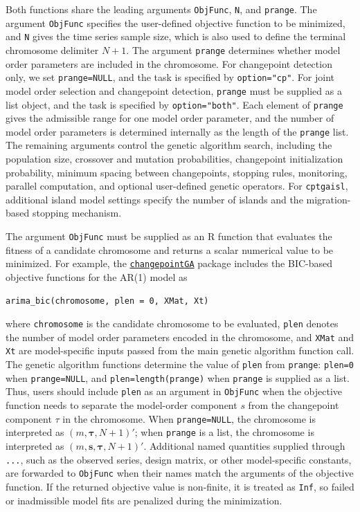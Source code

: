 Both functions share the leading arguments \texttt{ObjFunc}, \texttt{N}, and \texttt{prange}. The argument \texttt{ObjFunc} specifies the user-defined objective function to be minimized, and \texttt{N} gives the time series sample size, which is also used to define the terminal chromosome delimiter \(N+1\). The argument \texttt{prange} determines whether model order parameters are included in the chromosome. For changepoint detection only, we set \texttt{prange=NULL}, and the task is specified by \texttt{option="cp"}. For joint model order selection and changepoint detection, \texttt{prange} must be supplied as a list object, and the task is specified by \texttt{option="both"}. Each element of \texttt{prange} gives the admissible range for one model order parameter, and the number of model order parameters is determined internally as the length of the \texttt{prange} list. The remaining arguments control the genetic algorithm search, including the population size, crossover and mutation probabilities, changepoint initialization probability, minimum spacing between changepoints, stopping rules, monitoring, parallel computation, and optional user-defined genetic operators. For \texttt{cptgaisl}, additional island model settings specify the number of islands and the migration-based stopping mechanism.

The argument \texttt{ObjFunc} must be supplied as an R function that evaluates the fitness of a candidate chromosome and returns a scalar numerical value to be minimized. For example, the \href{https://CRAN.R-project.org/package=changepointGA}{\texttt{changepointGA}} package includes the BIC-based objective functions for the AR(1) model as

\begin{verbatim}
arima_bic(chromosome, plen = 0, XMat, Xt)
\end{verbatim}

where \texttt{chromosome} is the candidate chromosome to be evaluated, \texttt{plen} denotes the number of model order parameters encoded in the chromosome, and \texttt{XMat} and \texttt{Xt} are model-specific inputs passed from the main genetic algorithm function call. The genetic algorithm functions determine the value of \texttt{plen} from \texttt{prange}: \texttt{plen=0} when \texttt{prange=NULL}, and \texttt{plen=length(prange)} when \texttt{prange} is supplied as a list. Thus, users should include \texttt{plen} as an argument in \texttt{ObjFunc} when the objective function needs to separate the model-order component \(s\) from the changepoint component \(\tau\) in the chromosome. When \texttt{prange=NULL}, the chromosome is interpreted as \((m, \boldsymbol{\tau}, N+1)'\); when \texttt{prange} is a list, the chromosome is interpreted as \((m, \boldsymbol{s}, \boldsymbol{\tau}, N+1)'\). Additional named quantities supplied through \texttt{...}, such as the observed series, design matrix, or other model-specific constants, are forwarded to \texttt{ObjFunc} when their names match the arguments of the objective function. If the returned objective value is non-finite, it is treated as \texttt{Inf}, so failed or inadmissible model fits are penalized during the minimization.

